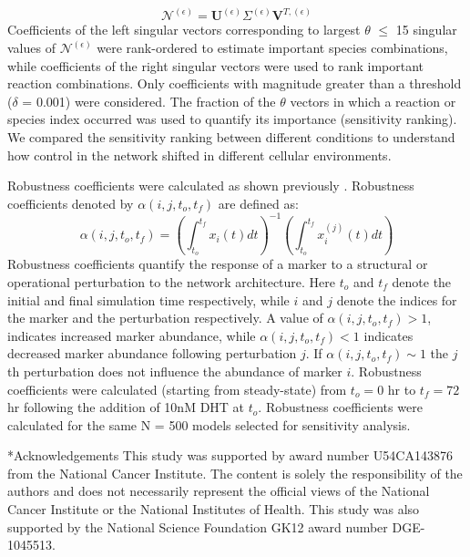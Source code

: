 \documentclass[12pt]{article}
\makeatletter
\renewcommand\section{\@startsection
	{subsection}{2}{0mm}
	{-0.2in}
	{0.05\baselineskip}
	{\normalfont\large\bfseries}}
\makeatother
\begin{document}
\begin{equation}
	\mathcal{N}^{\left(\epsilon\right)} = \mathbf{U}^{\left(\epsilon\right)}\Sigma^{\left(\epsilon\right)}\mathbf{V}^{T,{\left(\epsilon\right)}}
\end{equation}
Coefficients of the left singular vectors corresponding to largest $\theta$ $\leq$ 15 singular values of $\mathcal{N}^{\left(\epsilon\right)}$ were rank-ordered to estimate important species combinations, while coefficients of the right singular vectors were used to rank important reaction combinations. 
Only coefficients with magnitude greater than a threshold ($\delta$ = 0.001) were considered. 
The fraction of the $\theta$ vectors in which a reaction or species index occurred was used to quantify its importance (sensitivity ranking). 
We compared the sensitivity ranking between different conditions to understand how control in the network shifted in different cellular environments.  

Robustness coefficients were calculated as shown previously \cite{Tasseff2011}. 
Robustness coefficients denoted by $\alpha\left(i,j,t_{o},t_{f}\right)$ are defined as:
\begin{equation}
\alpha\left(i,j,t_{o},t_{f}\right)=\left(\displaystyle\int_{t_{o}}^{t_{f}}x_{i}\left(t\right)dt\right)^{-1}\left(\displaystyle\int_{t_{o}}^{t_{f}}x^{(j)}_{i}\left(t\right)dt\right)
\end{equation}
Robustness coefficients quantify the response of a marker to a structural or operational perturbation to the network architecture.
Here $t_o$ and $t_f$ denote the initial and final simulation time respectively, while $i$ and $j$ denote the indices for the marker and the perturbation respectively. 
A value of $\alpha\left(i,j,t_{o},t_{f}\right)>1$, indicates increased marker abundance, while $\alpha\left(i,j,t_{o},t_{f}\right)<1$ indicates decreased marker abundance following perturbation $j$. 
If $\alpha\left(i,j,t_{o},t_{f}\right)\sim{1}$ the $j$th perturbation does not influence the abundance of marker $i$.
Robustness coefficients were calculated (starting from steady-state) from $t_{o} = 0$ hr to $t_{f} = 72$ hr following the addition of 10nM DHT at $t_{o}$.
Robustness coefficients were calculated for the same N = 500 models selected for sensitivity analysis. 

\section*{Acknowledgements}
This study was supported by award number U54CA143876 from the National Cancer Institute.
The content is solely the responsibility of the authors and does not necessarily represent the official views of the National Cancer Institute or the National Institutes of Health.
This study was also supported by the National Science Foundation GK12 award number DGE-1045513.
\end{document}
